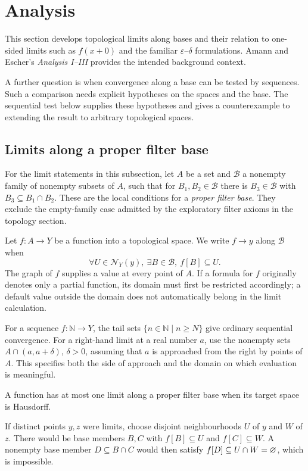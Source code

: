 \def\topic{Analysis}

\section{Analysis}
This section develops topological limits along bases and their relation
to one-sided limits such as $f(x+0)$ and the familiar
$\varepsilon$--$\delta$ formulations. Amann and Escher's
\emph{Analysis I--III} provides the intended background context.

A further question is when convergence along a base can be tested by
sequences. Such a comparison needs explicit hypotheses on the spaces and
the base. The sequential test below supplies these hypotheses and gives
a counterexample to extending the result to arbitrary topological spaces.

\subsection{Limits along a proper filter base}
For the limit statements in this subsection, let $A$ be a set and
$\mathcal{B}$ a nonempty family of nonempty subsets of $A$, such that
for $B_1,B_2\in\mathcal{B}$ there is $B_3\in\mathcal{B}$ with
$B_3\subseteq B_1\cap B_2$. These are the local conditions for a
\emph{proper filter base}. They exclude the empty-family case admitted
by the exploratory filter axioms in the topology section.

Let $f:A\to Y$ be a function into a topological space. We write
$f\to y$ along $\mathcal{B}$ when
\[
\forall U\in\mathcal{N}_Y(y),\ \exists B\in\mathcal{B},\ f[B]\subseteq U.
\]
The graph of $f$ supplies a value at every point of $A$. If a formula
for $f$ originally denotes only a partial function, its domain must
first be restricted accordingly; a default value outside the domain
does not automatically belong in the limit calculation.

For a sequence $f:\mathbb{N}\to Y$, the tail sets
$\{n\in\mathbb{N}\mid n\geqslant N\}$ give ordinary sequential
convergence. For a right-hand limit at a real number $a$, use the
nonempty sets $A\cap(a,a+\delta)$, $\delta>0$, assuming that $a$ is
approached from the right by points of $A$. This specifies both the
side of approach and the domain on which evaluation is meaningful.

\begin{lemma}
A function has at most one limit along a proper filter base when its
target space is Hausdorff.
\end{lemma}
\Proof
If distinct points $y,z$ were limits, choose disjoint neighbourhoods
$U$ of $y$ and $W$ of $z$. There would be base members $B,C$ with
$f[B]\subseteq U$ and $f[C]\subseteq W$. A nonempty base member
$D\subseteq B\cap C$ would then satisfy $f[D]\subseteq U\cap W
=\varnothing$, which is impossible.
\Done

